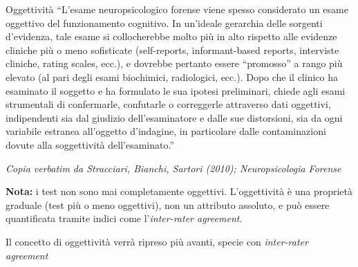 \documentclass[
  ignorenonframetext,
  aspectratio=169,
]{beamer}
\begin{document}
\begin{frame}{Oggettività}
\label{oggettivituxe0-1}
\footnotesize``L'esame neuropsicologico forense viene spesso considerato
un esame oggettivo del funzionamento cognitivo. In un'ideale gerarchia
delle sorgenti d'evidenza, tale esame si collocherebbe molto più in alto
rispetto alle evidenze cliniche più o meno sofisticate (self-reports,
informant-based reports, interviste cliniche, rating scales, ecc.), e
dovrebbe pertanto essere ``promosso'' a rango più elevato (al pari degli
esami biochimici, radiologici, ecc.). Dopo che il clinico ha esaminato
il soggetto e ha formulato le sua ipotesi preliminari, chiede agli esami
strumentali di confermarle, confutarle o correggerle attraverso dati
oggettivi, indipendenti sia dal giudizio dell'esaminatore e dalle sue
distorsioni, sia da ogni variabile estranea all'oggetto d'indagine, in
particolare dalle contaminazioni dovute alla soggettività
dell'esaminato.''

\begin{flushright}
\emph{Copia verbatim da  Stracciari, Bianchi, Sartori (2010); Neuropsicologia Forense}
\end{flushright}

\textbf{Nota:} i test non sono mai completamente oggettivi.
L'oggettività è una proprietà graduale (test più o meno oggettivi), non
un attributo assoluto, e può essere quantificata tramite indici come
l'\emph{inter-rater agreement}.

Il concetto di oggettività verrà ripreso più avanti, specie con
\emph{inter-rater agreement}
\end{frame}
\end{document}
